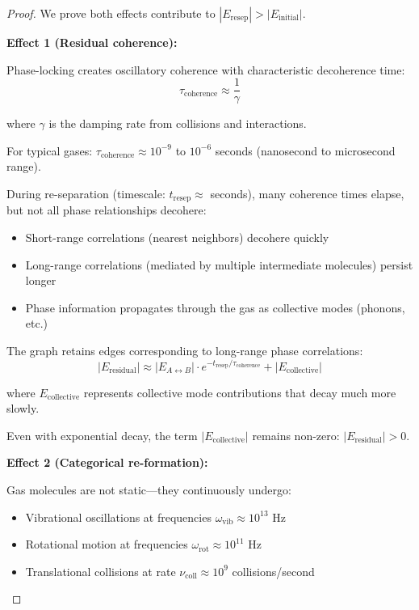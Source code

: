 \documentclass[12pt,a4paper]{article}
\theoremstyle{remark}
\begin{document}
\begin{proof}
We prove both effects contribute to $|E_{\text{resep}}| > |E_{\text{initial}}|$.

\textbf{Effect 1 (Residual coherence):}

Phase-locking creates oscillatory coherence with characteristic decoherence time:
\begin{equation}
\tau_{\text{coherence}} \approx \frac{1}{\gamma}
\end{equation}

where $\gamma$ is the damping rate from collisions and interactions.

For typical gases: $\tau_{\text{coherence}} \approx 10^{-9}$ to $10^{-6}$ seconds (nanosecond to microsecond range).

During re-separation (timescale: $t_{\text{resep}} \approx$ seconds), many coherence times elapse, but not all phase relationships decohere:
\begin{itemize}
\item Short-range correlations (nearest neighbors) decohere quickly
\item Long-range correlations (mediated by multiple intermediate molecules) persist longer
\item Phase information propagates through the gas as collective modes (phonons, etc.)
\end{itemize}

The graph retains edges corresponding to long-range phase correlations:
\begin{equation}
|E_{\text{residual}}| \approx |E_{A \leftrightarrow B}| \cdot e^{-t_{\text{resep}}/\tau_{\text{coherence}}} + |E_{\text{collective}}|
\end{equation}

where $E_{\text{collective}}$ represents collective mode contributions that decay much more slowly.

Even with exponential decay, the term $|E_{\text{collective}}|$ remains non-zero: $|E_{\text{residual}}| > 0$.

\textbf{Effect 2 (Categorical re-formation):}

Gas molecules are not static—they continuously undergo:
\begin{itemize}
\item Vibrational oscillations at frequencies $\omega_{\text{vib}} \approx 10^{13}$ Hz
\item Rotational motion at frequencies $\omega_{\text{rot}} \approx 10^{11}$ Hz  
\item Translational collisions at rate $\nu_{\text{coll}} \approx 10^9$ collisions/second
\end{itemize}


\end{proof}
\end{document}

